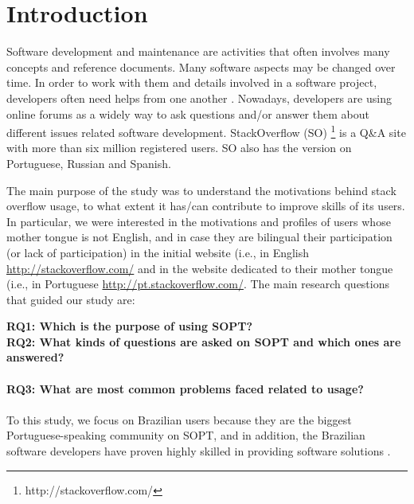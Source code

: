 \section{Introduction}

Software development and maintenance are activities that often involves many concepts and reference documents. Many software aspects may be changed over time. In order to work with them and details involved in a software project, developers often need helps from one another \cite{Wang2013}. Nowadays, developers are using online forums as a widely way to ask questions and/or answer them about different issues related software development. StackOverflow (SO) \footnote{http://stackoverflow.com/} is a Q\&A site with more than six million registered users. SO also has the version on Portuguese, Russian and Spanish. 

The main purpose of the study was to understand the motivations behind stack overflow usage, to what extent it has/can contribute to improve skills of its users. In particular, we were interested in the motivations and profiles of users whose mother tongue is not English, and in case they are bilingual their participation (or lack of participation) in the initial website (i.e., in English \url{http://stackoverflow.com/} and in the website dedicated to their mother tongue (i.e., in Portuguese \url{http://pt.stackoverflow.com/}. The main research questions that guided our study are:

\noindent \textbf{RQ1: Which is the purpose of using SOPT?}
 \\
\textbf{RQ2: What kinds of questions are asked on SOPT and which ones are answered?} \\ 
\\
\textbf{RQ3: What are most common problems faced related to usage?} \\ 
\\

To this study, we focus on Brazilian users because they are the biggest Portuguese-speaking community on SOPT, and in addition, the Brazilian software developers have proven highly skilled in providing software solutions .   
